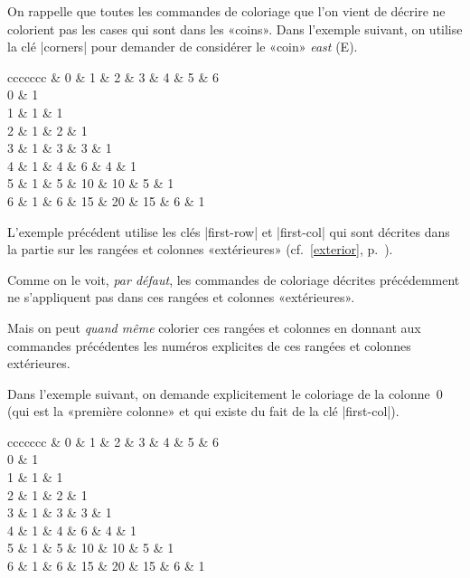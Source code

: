 \documentclass[dvipsnames]{article}
\let\myrlap\rlap
\begin{document}
\goodbreak
\vspace{1cm}
On rappelle que toutes les commandes de coloriage que l'on vient de décrire ne
colorient pas les cases qui sont dans les «coins». Dans l'exemple suivant, on
utilise la clé |corners| pour demander de considérer le «coin» \emph{east} (E).

\medskip
{}
\begin{Code}[width=10cm,show-output]
\begin{NiceTabular}{ccccccc}\myrlap{[\emph{corners=E},margin,hvlines,first-row,first-col]}
\CodeBefore
  \emph{}
\Body
    & 0 & 1 & 2 & 3 & 4 & 5 & 6 \\
  0 & 1 \\
  1 & 1 & 1 \\
  2 & 1 & 2 & 1 \\
  3 & 1 & 3 & 3 & 1 \\
  4 & 1 & 4 & 6 & 4 & 1 \\
  5 & 1 & 5 & 10 & 10 & 5 & 1 \\
  6 & 1 & 6 & 15 & 20 & 15 & 6 & 1 \\
\end{NiceTabular}
\end{Code}

\medbreak
L'exemple précédent utilise les clés |first-row| et |first-col| qui sont
décrites dans la partie sur les rangées et colonnes «extérieures»
(cf.~\ref{exterior}, p.~\pageref{exterior}).

Comme on le voit, \emph{par défaut}, les commandes de coloriage décrites précédemment ne
s'appliquent pas dans ces rangées et colonnes «extérieures».  

Mais on peut \emph{quand même} colorier ces rangées et colonnes en donnant aux
commandes précédentes les numéros explicites de ces rangées et colonnes
extérieures.

Dans l'exemple suivant, on demande explicitement le coloriage de la colonne~$0$
(qui est la «première colonne» et qui existe du fait de la clé |first-col|).

\medskip
\begin{Code}[width=10cm,show-output]
\begin{NiceTabular}{ccccccc}\myrlap{[\emph{corners=E},margin,hvlines,first-row,first-col]}
\CodeBefore
  \emph{}
\Body
    & 0 & 1 & 2 & 3 & 4 & 5 & 6 \\
  0 & 1 \\
  1 & 1 & 1 \\
  2 & 1 & 2 & 1 \\
  3 & 1 & 3 & 3 & 1 \\
  4 & 1 & 4 & 6 & 4 & 1 \\
  5 & 1 & 5 & 10 & 10 & 5 & 1 \\
  6 & 1 & 6 & 15 & 20 & 15 & 6 & 1 \\
\end{NiceTabular}
\end{Code}
\end{document}
